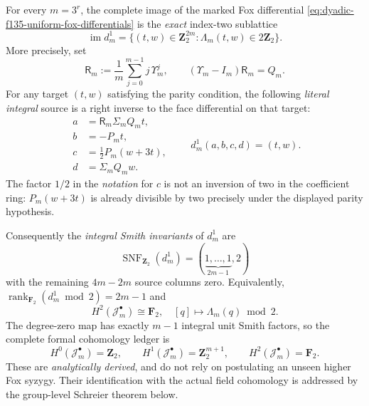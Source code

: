 \begin{theorem}
\label{thm:dyadic-f135-analytic-smith-parity}
For every $m=3^r$,
the complete
image of the
marked Fox differential
\eqref{eq:dyadic-f135-uniform-fox-differentials}
is the \emph{exact}
index-two sublattice
\begin{equation}\label{eq:dyadic-f135-image-is-parity-kernel}
\boxed{\qquad
\operatorname{im}d_m^1
=\bigl\{(t,w)\in
\mathbf Z_2^{2m}:
\Lambda_m(t,w)\in2\mathbf Z_2
\bigr\}.
\qquad}
\end{equation}
More precisely, set
\begin{equation}\label{eq:dyadic-f135-discrete-anti-difference}
\boxed{
\mathsf R_m:=
\frac1m\sum_{j=0}^{m-1}
j\,\Upsilon_m^j,
\qquad
(\Upsilon_m-I_m)\mathsf R_m
=Q_m.
}
\end{equation}
For any target
$(t,w)$ satisfying
the parity condition,
the following \emph{literal
integral} source
is a right inverse
to the face
differential on
that target:
\begin{equation}\label{eq:dyadic-f135-exact-face-solver}
\boxed{
\begin{aligned}
a&=\mathsf R_m
 \Sigma_m Q_m t,\\
b&=-P_m t,\\
c&=\tfrac12P_m(w+3t),\\
d&=\Sigma_m Q_m w.
\end{aligned}
\qquad
d_m^1(a,b,c,d)=(t,w).
}
\end{equation}
The factor
$1/2$ in the
\emph{notation}
for $c$ is not
an inversion
of two in the
coefficient ring:
$P_m(w+3t)$ is
already divisible
by two precisely
under the
displayed parity
hypothesis.

Consequently
the \emph{integral
Smith invariants}
of $d_m^1$ are
\begin{equation}\label{eq:dyadic-f135-all-3power-smith}
\boxed{\quad
\operatorname{SNF}_{\mathbf Z_2}(d_m^1)
=(\underbrace{1,\dots,1}_{2m-1},2)
\quad}
\end{equation}
with the remaining
$4m-2m$ source
columns zero.
Equivalently,
$\operatorname{rank}_{\mathbf F_2}
(d_m^1\bmod2)=2m-1$
and
\[
H^2(\mathcal J_m^\bullet)
\cong\mathbf F_2,
\quad
[q]\longmapsto
\Lambda_m(q)\bmod2.
\]
The degree-zero
map has exactly
$m-1$ integral
unit Smith factors,
so the complete
formal cohomology
ledger is
\begin{equation}\label{eq:dyadic-f135-formal-m-cohomology}
\boxed{\quad
H^0(\mathcal J_m^\bullet)=
\mathbf Z_2,\qquad
H^1(\mathcal J_m^\bullet)=
\mathbf Z_2^{m+1},\qquad
H^2(\mathcal J_m^\bullet)=
\mathbf F_2.
\quad}
\end{equation}
These are
\emph{analytically
derived}, and
do not rely on
postulating an
unseen higher
Fox syzygy.
Their
identification
with the actual
field cohomology
is addressed by
the group-level
Schreier theorem
below.
\end{theorem}

